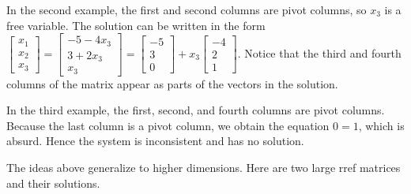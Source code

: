 {\begin{example}
In the second example, the first and second columns are pivot columns, so $x_3$ is a free variable.  The solution can be written in the form 
$\begin{bmatrix}x_1\\x_2\\x_3\end{bmatrix} = \begin{bmatrix}-5-4x_3\\3+2x_3\\x_3\end{bmatrix} = \begin{bmatrix}-5\\3\\0\end{bmatrix} + x_3 \begin{bmatrix}-4\\2\\1\end{bmatrix}$.  Notice that the third and fourth columns of the matrix appear as parts of the vectors in the solution.
\end{example}

\begin{example}
In the third example, the first, second, and fourth columns are pivot columns. Because the last column is a pivot column, we obtain the equation $0=1$, which is absurd.  Hence the system is inconsistent and has no solution.
\end{example}

\begin{example}
The ideas above generalize to higher dimensions. Here are two large rref matrices and their solutions.


\end{example}}

